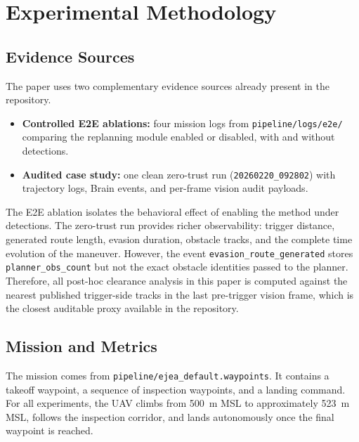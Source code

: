 \documentclass[a4paper,11pt]{article}
\begin{document}
\section{Experimental Methodology}

\subsection{Evidence Sources}

The paper uses two complementary evidence sources already present in the repository.
\begin{itemize}[leftmargin=1.3em]
    \item \textbf{Controlled E2E ablations:} four mission logs from \texttt{pipeline/logs/e2e/} comparing the replanning module enabled or disabled, with and without detections.
    \item \textbf{Audited case study:} one clean zero-trust run (\texttt{20260220\_092802}) with trajectory logs, Brain events, and per-frame vision audit payloads.
\end{itemize}

The E2E ablation isolates the behavioral effect of enabling the method under detections. The zero-trust run provides richer observability: trigger distance, generated route length, evasion duration, obstacle tracks, and the complete time evolution of the maneuver. However, the event \texttt{evasion\_route\_generated} stores \texttt{planner\_obs\_count} but not the exact obstacle identities passed to the planner. Therefore, all post-hoc clearance analysis in this paper is computed against the nearest published trigger-side tracks in the last pre-trigger vision frame, which is the closest auditable proxy available in the repository.

\subsection{Mission and Metrics}

The mission comes from \texttt{pipeline/ejea\_default.waypoints}. It contains a takeoff waypoint, a sequence of inspection waypoints, and a landing command. For all experiments, the UAV climbs from \SI{500}{\meter} MSL to approximately \SI{523}{\meter} MSL, follows the inspection corridor, and lands autonomously once the final waypoint is reached.
\end{document}
